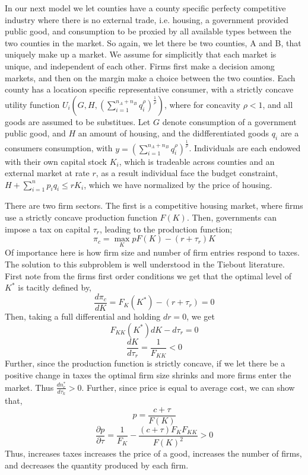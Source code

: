 \documentclass{article}
\begin{document}
In our next model we let counties have a county specific perfecty competitive industry where there is no external trade, i.e. housing, a government provided public good, and consumption to be proxied by all available types between the two counties in the market. So again, we let there be two counties, A and B, that uniquely make up a market. We assume for simplicitly that each market is unique, and independent of each other. Firms first make a decision among markets, and then on the margin make a choice between the two counties. Each county has a locatioon specific representative consumer, with a strictly concave utility function $U_{i}(G,H,\left(\sum_{i=1}^{n_{A}+n_{B}}q_{i}^{\rho}\right)^{\frac{1}{\rho}})$, where for concavity $\rho < 1$, and all goods are assumed to be substitues. Let $G$ denote consumption of a government public good, and $H$ an amount of housing, and the didfferentiated goods $q_{i}$ are a consumers consumption, with $y = \left(\sum_{i=1}^{n_{A}+n_{B}}q_{i}^{\rho}\right)^{\frac{1}{\rho}}$. Individuals are each endowed with their own capital stock $K_{i}$, which is tradeable across counties and an external market at rate $r$, as a result individual face the budget constraint, $H+\sum_{i=1}^{n}p_{i}q_{i} \leq rK_{i}$, which we have normalized by the price of housing.

There are two firm sectors. The first is a competitive housing market, where firms use a strictly concave production function $F(K)$. Then, governments can impose a tax on capital $\tau_{r}$, leading to the production function;
$$\pi_{c} = \max_{K} pF(K)-(r+\tau_{r})K$$
Of importance here is how firm size and number of firm entries respond to taxes. The solution to this subproblem is well understood in the Tiebout literature. First note from the firms first order conditions we get that the optimal level of $K^{*}$ is tacitly defined by,
$$\frac{d\pi_{c}}{dK} = F_{K}(K^{*})-(r+\tau_{r})=0$$
Then, taking a full differential and holding $dr = 0$, we get
$$F_{KK}(K^{*})dK-d\tau_{r}=0$$
$$\frac{dK}{d\tau_{r}} = \frac{1}{F_{KK}} < 0$$
Further, since the production function is strictly concave, if we let there be a positive change in taxes the optimal firm size shrinks and more firms enter the market. Thus $\frac{dn_{c}^{*}}{d\tau_{k}} > 0$. Further, since price is equal to average cost, we can show that,
$$p = \frac{c+\tau}{F(K)}$$
$$\frac{\partial p}{\partial \tau} = \frac{1}{F_{K}}-\frac{(c+\tau)F_{K}F_{KK}}{F(K)^{2}} > 0$$
Thus, increases taxes increases the price of a good, increases the number of firms, and decreases the quantity produced by each firm.
\end{document}
